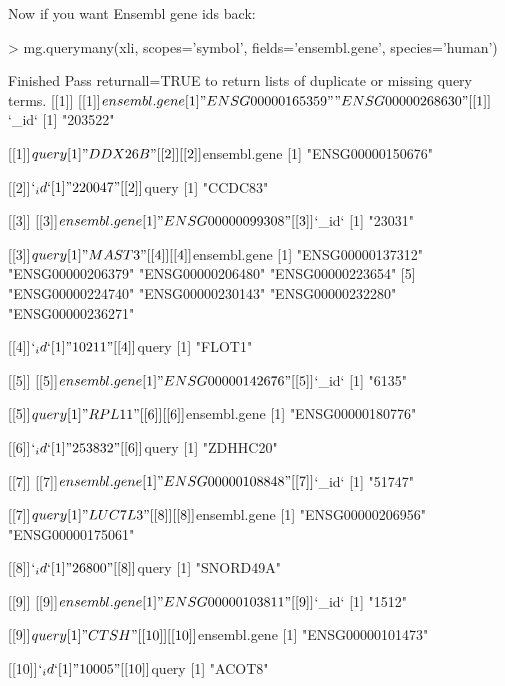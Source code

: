 \documentclass[12pt]{article}
\begin{document}
Now if you want Ensembl gene ids back:

\begin{Schunk}
\begin{Sinput}
> mg.querymany(xli, scopes='symbol', fields='ensembl.gene', species='human')
\end{Sinput}
\begin{Soutput}
Finished
Pass returnall=TRUE to return lists of duplicate or missing query terms.
[[1]]
[[1]]$ensembl.gene
[1] "ENSG00000165359" "ENSG00000268630"

[[1]]$`_id`
[1] "203522"

[[1]]$query
[1] "DDX26B"


[[2]]
[[2]]$ensembl.gene
[1] "ENSG00000150676"

[[2]]$`_id`
[1] "220047"

[[2]]$query
[1] "CCDC83"


[[3]]
[[3]]$ensembl.gene
[1] "ENSG00000099308"

[[3]]$`_id`
[1] "23031"

[[3]]$query
[1] "MAST3"


[[4]]
[[4]]$ensembl.gene
[1] "ENSG00000137312" "ENSG00000206379" "ENSG00000206480" "ENSG00000223654"
[5] "ENSG00000224740" "ENSG00000230143" "ENSG00000232280" "ENSG00000236271"

[[4]]$`_id`
[1] "10211"

[[4]]$query
[1] "FLOT1"


[[5]]
[[5]]$ensembl.gene
[1] "ENSG00000142676"

[[5]]$`_id`
[1] "6135"

[[5]]$query
[1] "RPL11"


[[6]]
[[6]]$ensembl.gene
[1] "ENSG00000180776"

[[6]]$`_id`
[1] "253832"

[[6]]$query
[1] "ZDHHC20"


[[7]]
[[7]]$ensembl.gene
[1] "ENSG00000108848"

[[7]]$`_id`
[1] "51747"

[[7]]$query
[1] "LUC7L3"


[[8]]
[[8]]$ensembl.gene
[1] "ENSG00000206956" "ENSG00000175061"

[[8]]$`_id`
[1] "26800"

[[8]]$query
[1] "SNORD49A"


[[9]]
[[9]]$ensembl.gene
[1] "ENSG00000103811"

[[9]]$`_id`
[1] "1512"

[[9]]$query
[1] "CTSH"


[[10]]
[[10]]$ensembl.gene
[1] "ENSG00000101473"

[[10]]$`_id`
[1] "10005"

[[10]]$query
[1] "ACOT8"
\end{Soutput}
\end{Schunk}
\end{document}

